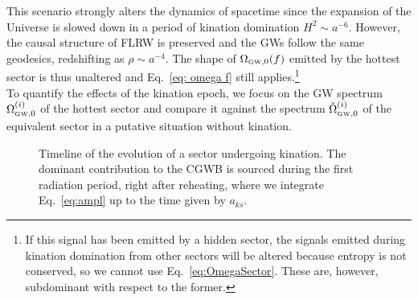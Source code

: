 \documentclass[a4paper,11pt]{article}
\newcommand{\tem}[2]{T_{\tiny{#1}}^{(#2)}}
\newcommand{\tti}[1]{\text{\tiny{#1}}}
\begin{document}
This scenario strongly alters the dynamics of spacetime
since the expansion of the Universe is slowed down in a period of kination domination $H^2\sim a^{-6}$.
However, the causal structure of FLRW is preserved and the GWs follow the same geodesics, redshifting as $\rho \sim a^{-4}$. The shape of $\Omega_{\tti{GW},0} (f)$ emitted by the hottest sector is thus unaltered and Eq.~\eqref{eq: omega f} still applies.\footnote{If this signal has been emitted by a hidden sector, the signals emitted during kination domination from other sectors will be altered because entropy is not conserved, so we cannot use Eq.~\eqref{eq:OmegaSector}. These are, however, subdominant with respect to the former.}\\

To quantify the effects of the kination epoch,
we focus on the GW spectrum $\Omega_{\tti{GW},0}^{(i)}$ of the hottest sector and compare it against the spectrum $\tilde{\Omega}_{\tti{GW},0}^{(i)}$ of the equivalent sector in a putative situation without kination. 
\begin{figure}[t!]
\centering
  \caption{Timeline of the evolution of a sector undergoing kination. The dominant contribution to the CGWB is sourced during the first radiation period, right after reheating, where we integrate Eq.~\eqref{eq:ampl} up to the time given by $a_{ks}$. \label{fig:timeline}}
\end{figure}
\end{document}

